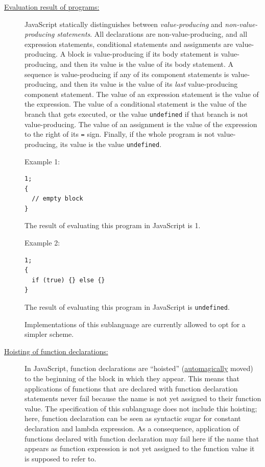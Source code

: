 \begin{description}
\item[\href{https://sourceacademy.org/sicpjs/4.1.1\#footnote-4}{Evaluation result of programs:}]
JavaScript statically
        distinguishes between \emph{value-producing} and
	\emph{non-value-producing statements}. All declarations are
	non-value-producing, and all 
	expression statements, conditional statements and assignments are
	value-producing.
	A block is value-producing if its body statement
	is value-producing, and then its value is the value of its body
	statement. A sequence is value-producing if any of
	its component statements is value-producing, and then its value is
	the value of its \emph{last} value-producing component statement.
	The value of an expression statement is the value of the expression.
	The value of a conditional statement is the value of the branch that
	gets executed, or the value
	\lstinline{undefined} if that branch is
	not value-producing.
	The value of an assignment is the value of the expression
	to the right of its \lstinline{=} sign.
	Finally, if the whole
	program	is not value-producing, its value is the value
        \lstinline{undefined}.        

  Example 1:
  \begin{lstlisting}
1;
{
  // empty block
}
  \end{lstlisting}
  The result of evaluating this program in JavaScript is 1.

  Example 2:
  \begin{lstlisting}
1;
{
  if (true) {} else {}
}
  \end{lstlisting}
  The result of evaluating this program in JavaScript is \texttt{undefined}.

  Implementations of this sublanguage are currently allowed to opt for a simpler scheme.

\item[\href{https://sourceacademy.org/sicpjs/1.3.2\#footnote-2}{Hoisting of function declarations:}] In JavaScript, function declarations
  are ``hoisted''
  (\href{https://sourceacademy.org/sicpjs/4.3.1#footnote-4}{automagically} moved)
  to the beginning of the block in which
  they appear. This means that applications of functions that are declared
  with function declaration statements never fail because the name is not
  yet assigned to their function value. The specification of this sublanguage does
  not include this hoisting; here, function declaration can be seen as
  syntactic sugar for constant declaration and lambda expression.
  As a consequence, application of functions declared with function declaration
  may fail here if the name that appears as function expression is not yet
  assigned to the function value it is supposed to refer to.
\end{description}
